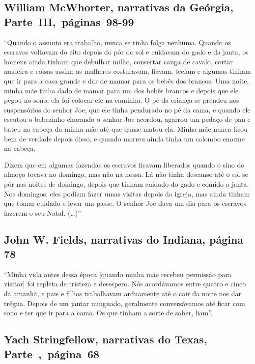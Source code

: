 \subsection{William McWhorter, narrativas da Geórgia, Parte~III,~páginas~98-99}
\label{ref188}

``Quando o assunto era trabalho, nunca se tinha folga nenhuma. Quando os
escravos voltavam do eito depois do pôr do sol e cuidavam do gado e da
janta, os homens ainda tinham que debulhar milho, consertar canga de
cavalo, cortar madeira e coisas assim; as mulheres costuravam, fiavam,
teciam e algumas tinham que ir para a casa grande e dar de mamar para os
bebês dos brancos. Uma noite, minha mãe tinha dado de mamar para um dos
bebês brancos e depois que ele pegou no sono, ela foi colocar ele na
caminha. O pé da criança se prendeu nos suspensórios do senhor Joe, que
ele tinha pendurado no pé da cama, e quando ele escutou o bebezinho
chorando o senhor Joe acordou, agarrou um pedaço de pau e bateu na
cabeça da minha mãe até que quase matou ela. Minha mãe nunca ficou bem
de verdade depois disso, e quando morreu ainda tinha um calombo enorme
na cabeça.

Dizem que em algumas fazendas os escravos ficavam liberados quando o
sino do almoço tocava no domingo, mas não na nossa. Lá não tinha
descanso até o sol se pôr nas noites de domingo, depois que tinham
cuidado do gado e comido a janta. Nos domingos, eles podiam fazer umas
visitas depois da igreja, mas ainda tinham que tomar cuidado e levar um
passe. O senhor Joe dava um dia para os escravos fazerem o seu Natal.
(\ldots{})'' %

\subsection{John W. Fields, narrativas do Indiana, página 78} \label{ref89}

``Minha vida antes dessa época {[}quando minha mãe recebeu permissão
para visitar{]} foi repleta de tristeza e desespero. Nós acordávamos
entre quatro e cinco da amanhã, e pais e filhos trabalhavam arduamente %
até o cair da noite nos dar trégua. Depois de um jantar minguado,
geralmente conversávamos até ficar com sono e ter que ir para a cama. Os
que tinham a sorte de saber, liam''.

\subsection{Yach Stringfellow, narrativas do Texas, Parte~,~página~68}
\label{ref254} 

